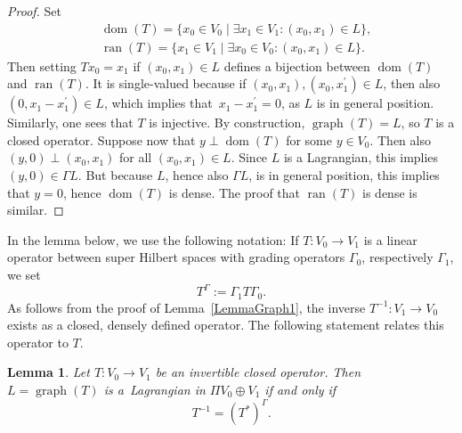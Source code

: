 \documentclass[pdftex]{sigma}
\numberwithin{equation}{section}
\newtheorem{Lemma}[Theorem]{Lemma}
\DeclareMathOperator*{\ran}{ran}
\DeclareMathOperator{\dom}{\mathrm{dom}}
\DeclareMathOperator{\graph}{\mathrm{graph}}
\begin{document}
\begin{proof}
Set
\begin{align*}
&\dom(T) = \{x_0 \in V_0 \mid \exists x_1 \in V_1\colon (x_0, x_1) \in L\}, \\
&\ran(T) = \{x_1\in V_1 \mid \exists x_0 \in V_0\colon (x_0, x_1) \in L\}.
\end{align*}
Then setting $Tx_0 = x_1$ if $(x_0, x_1) \in L$ defines a bijection between $\dom(T)$ and $\ran(T)$.
It is single-valued because if $(x_0, x_1), (x_0, x_1^\prime) \in L$, then also $(0, x_1 - x_1^\prime)\in L$, which implies that~${x_1 - x_1^\prime = 0}$, as $L$ is in general position.
Similarly, one sees that $T$ is injective.
By construction, ${\graph(T) = L}$, so $T$ is a closed operator.
Suppose now that $y \perp \dom(T)$ for some $y \in V_0$.
Then also $(y, 0) \perp (x_0, x_1)$ for all $(x_0, x_1) \in L$.
Since $L$ is a Lagrangian, this implies $(y, 0) \in \Gamma{L}$.
But because ${L}$, hence also $\Gamma{L}$, is in general position, this implies that $y=0$, hence $\dom(T)$ is dense.
The proof that $\ran(T)$ is dense is similar.
\end{proof}

In the lemma below, we use the following notation:
If $T\colon V_0 \to V_1$ is a linear operator between super Hilbert spaces with grading operators $\Gamma_0$, respectively $\Gamma_1$, we set
\begin{equation*}
 T^\Gamma := \Gamma_1 T \Gamma_0.
\end{equation*}
As follows from the proof of Lemma~\ref{LemmaGraph1}, the inverse $T^{-1}\colon V_1 \to V_0$ exists as a closed, densely defined operator.
The following statement relates this operator to $T$.

\begin{Lemma} \label{LemmaRelationTAdjointInverse}
Let $T\colon V_0 \to V_1$ be an invertible closed operator.
Then $L = \graph(T)$ is a~Lagrangian in $\Pi V_0 \oplus V_1$ if and only if
\begin{equation} \label{RelationTAdjointInverse}
 T^{-1} = (T^*)^\Gamma.
\end{equation}
\end{Lemma}
\end{document}
